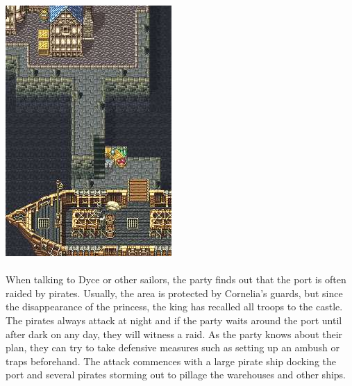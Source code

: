 \includegraphics[width=\columnwidth]{./art/chaosincornelia/port.jpg} \ofpar
%
\\\\
%
When talking to Dyce or other sailors, the party finds out that the port is often raided by pirates.
Usually, the area is protected by Cornelia's guards, but since the disappearance of the princess, the king has recalled all troops to the castle.
The pirates always attack at night and if the party waits around the port until after dark on any day, they will witness a raid.
As the party knows about their plan, they can try to take defensive measures such as setting up an ambush or traps beforehand.
The attack commences with a large pirate ship docking the port and several pirates storming out to pillage the warehouses and other ships.
